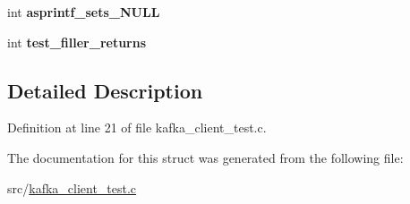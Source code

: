 \begin{DoxyCompactItemize}
\item 
\hypertarget{structtest__config_a211d0bc30b66785619572f2ad06dd9f3}{int {\bfseries asprintf\-\_\-sets\-\_\-\-N\-U\-L\-L}}\label{structtest__config_a211d0bc30b66785619572f2ad06dd9f3}

\item 
\hypertarget{structtest__config_a09f566e91c7300bbe40e9125a8a6cbfb}{int {\bfseries test\-\_\-filler\-\_\-returns}}\label{structtest__config_a09f566e91c7300bbe40e9125a8a6cbfb}

\end{DoxyCompactItemize}


\subsection{\-Detailed \-Description}


\-Definition at line 21 of file kafka\-\_\-client\-\_\-test.\-c.



\-The documentation for this struct was generated from the following file\-:\begin{DoxyCompactItemize}
\item 
src/\hyperlink{kafka__client__test_8c}{kafka\-\_\-client\-\_\-test.\-c}\end{DoxyCompactItemize}
